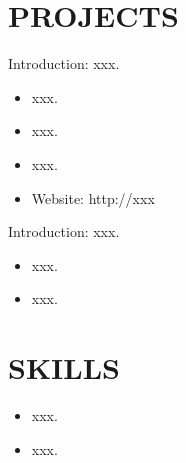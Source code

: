 \documentclass{resume}
\begin{document}
\bigskip

\section{PROJECTS}
Introduction: xxx.
\begin{itemize}
\item xxx. 
\item xxx.
\item xxx.
\item Website: http://xxx
\end{itemize}
\bigskip

Introduction: xxx.
\begin{itemize}
\item xxx.
\item xxx.
\end{itemize}


\bigskip

\section{SKILLS}
\begin{itemize}
	\item xxx.
	\item xxx.
\end{itemize}


%
%
\end{document}
